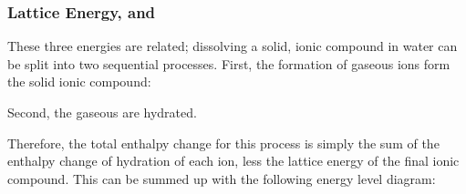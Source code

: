 

			\subsubsection{Lattice Energy,  and }

				These three energies are related; dissolving a solid, ionic compound in water can be split into two sequential processes.
				First, the formation of gaseous ions form the solid ionic compound:


				Second, the gaseous are hydrated.


				Therefore, the total enthalpy change for this process is simply the sum of the enthalpy change of hydration of each ion, less
				the lattice energy of the final ionic compound. This can be summed up with the following energy level diagram:




































































